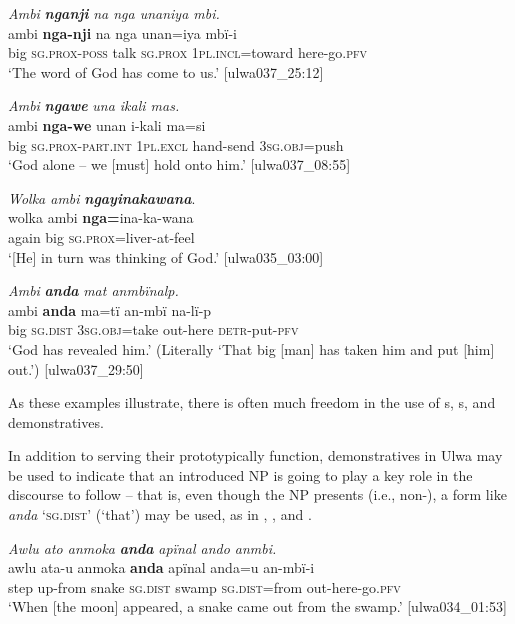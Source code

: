 \ea%
    \label{ex:det:125}
          \textit{Ambi} \textbf{\textit{nganji}} \textit{na nga unaniya mbi.}\\
\gll    ambi  \textbf{nga-nji}    na    nga      unan=iya mbï-i\\
    big    \textsc{sg.prox-poss}  talk  \textsc{sg.prox}  1\textsc{pl.incl=}toward   here-go.\textsc{pfv}\\
\glt `The word of God has come to us.’ [ulwa037\_25:12]
\z

\ea%
    \label{ex:det:126}
          \textit{Ambi} \textbf{\textit{ngawe}} \textit{una ikali mas.}\\
\gll    ambi  \textbf{nga-we}      unan    i-kali    ma=si\\
    big    \textsc{sg.prox-part.int}  \textsc{1pl.excl}  hand-send  3\textsc{sg.obj}=push\\
\glt `God alone -- we [must] hold onto him.’ [ulwa037\_08:55]
\z

\ea%
    \label{ex:det:127}
          \textit{Wolka ambi} \textbf{\textit{ngayinakawana}}.\\
\gll wolka  ambi  \textbf{nga=}ina-ka-wana\\
    again  big    \textsc{sg.prox=}liver-at-feel\\
\glt `[He] in turn was thinking of God.’ [ulwa035\_03:00]
\z

\ea%
    \label{ex:det:128}
          \textit{Ambi} \textbf{\textit{anda}} \textit{mat anmbïnalp.}\\
\gll    ambi  \textbf{anda}    ma=tï      an-mbï    na-lï{}-p\\
    big    \textsc{sg.dist}  \textsc{3sg.obj}=take  out-here  \textsc{detr-}put-\textsc{pfv}\\
\glt `God has revealed him.’ (Literally ‘That big [man] has taken him and put [him] out.’) [ulwa037\_29:50]
\z

As these examples illustrate, there is often much freedom in the use of s, s, and demonstratives.

  In addition to serving their prototypically  function, demonstratives in Ulwa may be used to indicate that an introduced NP is going to play a key role in the discourse to follow -- that is, even though the NP presents  (i.e., non-), a form like \textit{anda} ‘\textsc{sg.dist}’ (‘that’) may be used, as in , , and .

\ea%
    \label{ex:det:129}
          \textit{Awlu ato anmoka} \textbf{\textit{anda}} \textit{apïnal ando anmbi.}\\
\gll    awlu  ata-u    anmoka  \textbf{anda}    apïnal  anda=u an-mbï-i\\
    step  up-from  snake    \textsc{sg.dist}  swamp  \textsc{sg.dist}=from    out-here-go.\textsc{pfv}\\
\glt `When [the moon] appeared, a snake came out from the swamp.’ [ulwa034\_01:53]
\z

